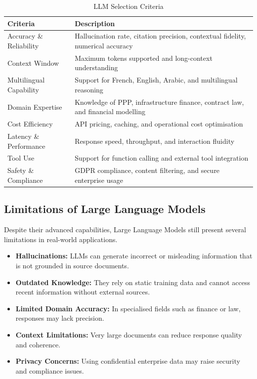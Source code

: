 \begin{table}[H]
\centering
\caption{LLM Selection Criteria}
\label{tab:llm_criteria}
\begin{tabular}{|p{5cm}|p{9cm}|}
\hline
\textbf{Criteria} & \textbf{Description} \\
\hline

Accuracy \& Reliability &
Hallucination rate, citation precision, contextual fidelity,
numerical accuracy \\
\hline

Context Window &
Maximum tokens supported and long-context understanding \\
\hline

Multilingual Capability &
Support for French, English, Arabic, and multilingual reasoning \\
\hline

Domain Expertise &
Knowledge of PPP, infrastructure finance, contract law,
and financial modelling \\
\hline

Cost Efficiency &
API pricing, caching, and operational cost optimisation \\
\hline

Latency \& Performance &
Response speed, throughput, and interaction fluidity \\
\hline

Tool Use &
Support for function calling and external tool integration \\
\hline

Safety \& Compliance &
GDPR compliance, content filtering, and secure enterprise usage \\
\hline

\end{tabular}
\end{table}


\subsection{Limitations of Large Language Models}
Despite their advanced capabilities, Large Language Models still present several limitations in real-world applications.
\begin{itemize}[noitemsep, topsep=2pt]
  \item \textbf{Hallucinations:} LLMs can generate incorrect or misleading information that is not grounded in source documents.
  \item \textbf{Outdated Knowledge:} They rely on static training data and cannot access recent information without external sources.
  \item \textbf{Limited Domain Accuracy:} In specialised fields such as finance or law, responses may lack precision.
  \item \textbf{Context Limitations:} Very large documents can reduce response quality and coherence.
  \item \textbf{Privacy Concerns:} Using confidential enterprise data may raise security and compliance issues.
\end{itemize}

